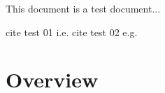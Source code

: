 \documentclass{article}
\begin{document}
This document is a test document...

cite test 01 i.e.
cite test 02 e.g.


\section{Overview}
\end{document}
